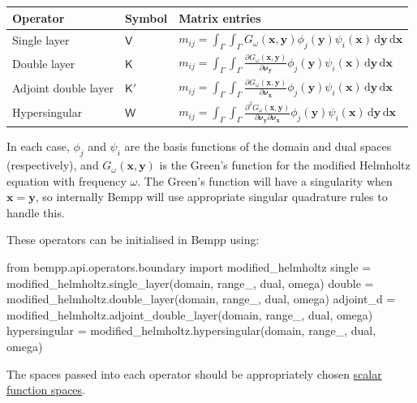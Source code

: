 \documentclass[a4paper]{book}
\begin{document}
\begin{center}
\begin{tabular}{|l|l|l|}
\hline
Operator             & Symbol        & Matrix entries\\
\hline
Single layer         & $\mathsf{V}$  & $\displaystyle m_{ij}=\int_{\Gamma}\int_{\Gamma}G_\omega(\mathbf{x},\mathbf{y})\phi_j(\mathbf{y})\psi_i(\mathbf{x})\,\mathrm{d}\mathbf{y}\,\mathrm{d}\mathbf{x}$\\
Double layer         & $\mathsf{K}$  & $\displaystyle m_{ij}=\int_{\Gamma}\int_{\Gamma}\frac{\partial G_\omega(\mathbf{x},\mathbf{y})}{\partial\mathbf{\nu}_{\mathbf{y}}}\phi_j(\mathbf{y})\psi_i(\mathbf{x})\,\mathrm{d}\mathbf{y}\,\mathrm{d}\mathbf{x}$\\
Adjoint double layer & $\mathsf{K}'$ & $\displaystyle m_{ij}=\int_{\Gamma}\int_{\Gamma}\frac{\partial G_\omega(\mathbf{x},\mathbf{y})}{\partial\mathbf{\nu}_{\mathbf{x}}}\phi_j(\mathbf{y})\psi_i(\mathbf{x})\,\mathrm{d}\mathbf{y}\,\mathrm{d}\mathbf{x}$\\
Hypersingular        & $\mathsf{W}$  & $\displaystyle m_{ij}=\int_{\Gamma}\int_{\Gamma}\frac{\partial^2 G_\omega(\mathbf{x},\mathbf{y})}{\partial\mathbf{\nu}_{\mathbf{y}}\partial\mathbf{\nu}_{\mathbf{x}}}\phi_j(\mathbf{y})\psi_i(\mathbf{x})\,\mathrm{d}\mathbf{y}\,\mathrm{d}\mathbf{x}$\\
\hline
\end{tabular}
\end{center}
In each case,  $\phi_j$ and $\psi_i$ are the basis functions of the domain and dual spaces (respectively),
and $G_\omega(\mathbf{x},\mathbf{y})$ is the Green's function for the modified Helmholtz equation with
frequency $\omega$.
The Green's function will have a singularity when $\mathbf{x}=\mathbf{y}$, so internally Bempp will
use appropriate singular quadrature rules to handle this.

These operators can be initialised in Bempp using:
\begin{python}
from bempp.api.operators.boundary import modified_helmholtz
single = modified_helmholtz.single_layer(domain, range_, dual, omega)
double = modified_helmholtz.double_layer(domain, range_, dual, omega)
adjoint_d = modified_helmholtz.adjoint_double_layer(domain, range_, dual, omega)
hypersingular = modified_helmholtz.hypersingular(domain, range_, dual, omega)
\end{python}
The spaces passed into each operator should be appropriately chosen
\href{scalar_function_spaces.md}{scalar function spaces}.
\end{document}
